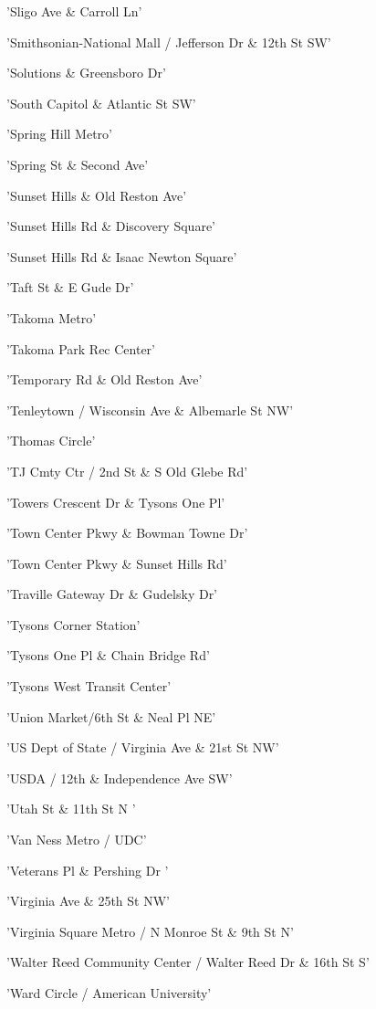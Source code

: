 \documentclass[11pt]{article}
\begin{document}
\begin{enumerate*}
\item 'Sligo Ave \& Carroll Ln'
\item 'Smithsonian-National Mall / Jefferson Dr \& 12th St SW'
\item 'Solutions \& Greensboro Dr'
\item 'South Capitol \& Atlantic St SW'
\item 'Spring Hill Metro'
\item 'Spring St \& Second Ave'
\item 'Sunset Hills \& Old Reston Ave'
\item 'Sunset Hills Rd \& Discovery Square'
\item 'Sunset Hills Rd \& Isaac Newton Square'
\item 'Taft St \& E Gude Dr'
\item 'Takoma Metro'
\item 'Takoma Park Rec Center'
\item 'Temporary Rd \& Old Reston Ave'
\item 'Tenleytown / Wisconsin Ave \& Albemarle St NW'
\item 'Thomas Circle'
\item 'TJ Cmty Ctr / 2nd St \& S Old Glebe Rd'
\item 'Towers Crescent Dr \& Tysons One Pl'
\item 'Town Center Pkwy \& Bowman Towne Dr'
\item 'Town Center Pkwy \& Sunset Hills Rd'
\item 'Traville Gateway Dr \& Gudelsky Dr'
\item 'Tysons Corner Station'
\item 'Tysons One Pl \& Chain Bridge Rd'
\item 'Tysons West Transit Center'
\item 'Union Market/6th St \& Neal Pl NE'
\item 'US Dept of State / Virginia Ave \& 21st St NW'
\item 'USDA / 12th \& Independence Ave SW'
\item 'Utah St \& 11th St N '
\item 'Van Ness Metro / UDC'
\item 'Veterans Pl \& Pershing Dr '
\item 'Virginia Ave \& 25th St NW'
\item 'Virginia Square Metro / N Monroe St \& 9th St N'
\item 'Walter Reed Community Center / Walter Reed Dr \& 16th St S'
\item 'Ward Circle / American University'

\end{enumerate*}
\end{document}
